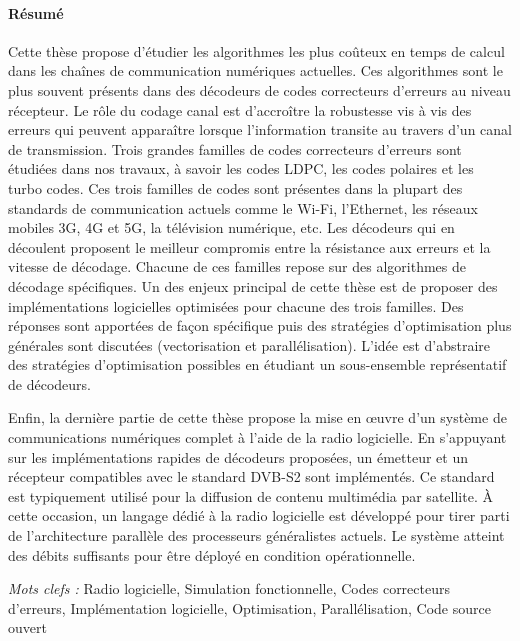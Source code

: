 \documentclass[a4paper, 11pt]{article}
\begin{document}
\thispagestyle{empty}

\paragraph{Résumé}

Cette thèse propose d'étudier les algorithmes les plus coûteux en temps de
calcul dans les chaînes de communication numériques actuelles. Ces algorithmes
sont le plus souvent présents dans des décodeurs de codes correcteurs d'erreurs
au niveau récepteur. Le rôle du codage canal est d’accroître la robustesse vis à
vis des erreurs qui peuvent apparaître lorsque l'information transite au travers
d'un canal de transmission. Trois grandes familles de codes correcteurs
d'erreurs sont étudiées dans nos travaux, à savoir les codes LDPC, les codes
polaires et les turbo codes. Ces trois familles de codes sont présentes dans la
plupart des standards de communication actuels comme le Wi-Fi, l’Ethernet, les
réseaux mobiles 3G, 4G et 5G, la télévision numérique, etc. Les décodeurs qui en
découlent proposent le meilleur compromis entre la résistance aux erreurs et la
vitesse de décodage. Chacune de ces familles repose sur des algorithmes de
décodage spécifiques. Un des enjeux principal de cette thèse est de proposer des
implémentations logicielles optimisées pour chacune des trois familles. Des
réponses sont apportées de façon spécifique puis des stratégies d'optimisation
plus générales sont discutées (vectorisation et parallélisation). L'idée est
d'abstraire des stratégies d'optimisation possibles en étudiant un sous-ensemble
représentatif de décodeurs.

Enfin, la dernière partie de cette thèse propose la mise en œuvre d'un système
de communications numériques complet à l'aide de la radio logicielle. En
s’appuyant sur les implémentations rapides de décodeurs proposées, un émetteur
et un récepteur compatibles avec le standard DVB-S2 sont implémentés. Ce
standard est typiquement utilisé pour la diffusion de contenu multimédia par
satellite. À cette occasion, un langage dédié à la radio logicielle est
développé pour tirer parti de l'architecture parallèle des processeurs
généralistes actuels. Le système atteint des débits suffisants pour être déployé
en condition opérationnelle.

\vskip0.5cm
\emph{Mots clefs :} Radio logicielle, Simulation fonctionnelle, Codes
                    correcteurs d'erreurs, Implémentation logicielle,
                    Optimisation, Parallélisation, Code source ouvert
\end{document}
